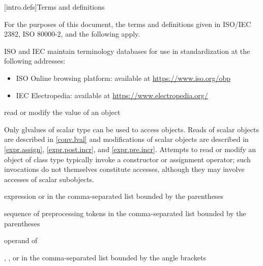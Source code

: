 [intro.defs]{Terms and definitions}

\pnum
{}%
For the purposes of this document,
the terms and definitions
given in ISO/IEC 2382, ISO 80000-2,
and the following apply.

\pnum
ISO and IEC maintain terminology databases
for use in standardization
at the following addresses:
\begin{itemize}
\item ISO Online browsing platform: available at \url{https://www.iso.org/obp}
\item IEC Electropedia: available at \url{https://www.electropedia.org/}
\end{itemize}

%
read or modify the value of an object

\begin{defnote}
Only glvalues of scalar type can be used to access objects.
Reads of scalar objects are described in \ref{conv.lval} and
modifications of scalar objects are described in
\ref{expr.assign}, \ref{expr.post.incr}, and \ref{expr.pre.incr}.
Attempts to read or modify an object of class type
typically invoke a constructor
or assignment operator;
such invocations do not themselves constitute accesses,
although they may involve accesses of scalar subobjects.
\end{defnote}

%
expression or 
in the comma-separated list bounded by the parentheses

%
%
 sequence of preprocessing tokens in the
comma-separated list bounded by the parentheses

%
%
 operand of 

%
%
,
, or
 in the comma-separated
list bounded by the angle brackets

